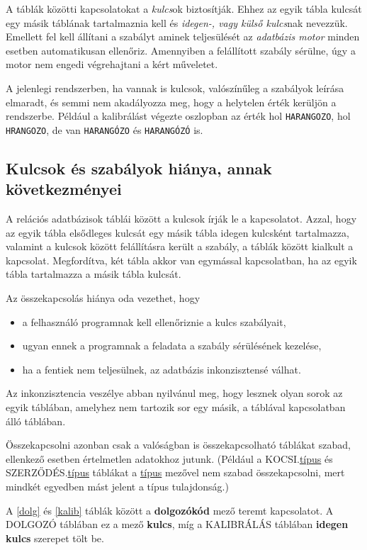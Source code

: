 \documentclass[a4paper,12pt]{report}
\newcommand{\tmezo}[2]{\MakeUppercase{#1}.{\underline{#2}}} %
\begin{document}
A táblák közötti kapcsolatokat a \textit{kulcs}ok biztosítják. Ehhez az egyik 
tábla kulcsát egy másik táblának tartalmaznia kell és \textit{idegen-, vagy 
külső kulcs}nak nevezzük. Emellett fel kell állítani a szabályt aminek 
teljesülését az \textit{adatbázis motor} minden esetben automatikusan ellenőriz. 
Amennyiben a felállított szabály sérülne, úgy a motor nem engedi végrehajtani a 
kért műveletet.

A jelenlegi rendszerben, ha vannak is kulcsok, valószínűleg a szabályok leírása 
elmaradt, és semmi nem akadályozza meg, hogy a helytelen érték kerüljön a 
rendszerbe. Például a kalibrálást végezte oszlopban az érték hol 
\texttt{HARANGOZO}, hol \texttt{HRANGOZO}, de van \texttt{HARANGÓZO} és 
\texttt{HARANGÓZÓ} is.

\subsection{Kulcsok és szabályok hiánya, annak következményei}
A relációs adatbázisok táblái között a kulcsok írják le a kapcsolatot. Azzal, 
hogy az egyik tábla elsődleges kulcsát egy másik tábla idegen kulcsként 
tartalmazza, valamint a kulcsok között felállításra került a szabály, a táblák 
között kialkult a kapcsolat. Megfordítva, két tábla akkor van egymással 
kapcsolatban, ha az egyik tábla tartalmazza a másik tábla kulcsát.

Az összekapcsolás hiánya oda vezethet, hogy
\begin{itemize}
\item a felhasználó programnak kell ellenőriznie a kulcs szabályait,
\item ugyan ennek a programnak a feladata a szabály sérülésének kezelése,
\item ha a fentiek nem teljesülnek, az adatbázis inkonzisztensé válhat.
\end{itemize}
Az inkonzisztencia veszélye abban nyilvánul meg, hogy lesznek olyan sorok az 
egyik táblában, amelyhez nem tartozik sor egy másik, a táblával kapcsolatban 
álló táblában.

Összekapcsolni azonban csak a valóságban is összekapcsolható táblákat szabad, ellenkező esetben értelmetlen adatokhoz jutunk. (Például a \tmezo{kocsi}{típus} és \tmezo{szerződés}{típus} táblákat a \underline{típus} mezővel nem szabad összekapcsolni, mert mindkét egyedben mást jelent a típus tulajdonság.)

A \ref{dolg} és \ref{kalib} táblák között a \textbf{dolgozókód} mező teremt
kapcsolatot. A DOLGOZÓ táblában ez a mező \textbf{kulcs}, míg a KALIBRÁLÁS 
táblában \textbf{idegen kulcs} szerepet tölt be.
\end{document}

